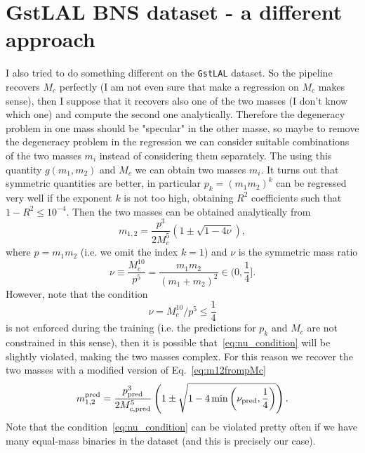 \documentclass[prd,aps,twocolumn,a4paper,showkeys,nofootinbib]{revtex4-1}
\begin{document}
\section{GstLAL BNS dataset - a different approach}
\label{sec:GstLAL2}
I also tried to do something different on the \texttt{GstLAL} dataset. 
So the pipeline recovers $M_c$ perfectly (I am not even sure that make a regression on $M_c$
makes sense), then I suppose that it recovers also one of the two masses 
(I don't know which one) and compute the second one analytically. Therefore the degeneracy problem
in one mass should be "specular" in the other masse, so maybe to remove the degeneracy problem
in the regression we can consider suitable combinations of the two masses $m_i$ instead of 
considering them separately. The using this quantity $g(m_1,m_2)$ and $M_c$ we can obtain 
two masses $m_i$. It turns out that symmetric quantities are better, in particular 
$p_k= (m_1 m_2)^k$ can be regressed very well if the exponent $k$ is not too high, 
obtaining $R^2$ coefficients such that $1-R^2 \leq 10^{-4}$. Then the two masses can be
obtained analytically from
\begin{equation}
\label{eq:m12frompMc}
m_{1,2} = \frac{p^3}{2 M_c^5}\left( 1 \pm \sqrt{1-4\nu} \right),
\end{equation}
where $p=m_1 m_2$ (i.e. we omit the index $k=1$) and $\nu$ is the symmetric mass ratio
\begin{equation}
\nu \equiv \frac{M_c^{10}}{p^5} = \frac{m_1 m_2}{(m_1+m_2)^2}\in (0, \frac{1}{4}].
\end{equation}
However, note that the condition
\begin{equation}
\label{eq:nu_condition}
\nu=M_c^{10}/p^5\leq \frac{1}{4}
\end{equation} 
is not enforced during the training (i.e. the predictions for 
$p_k$ and $M_c$ are not constrained in this sense), 
then it is possible that~\eqref{eq:nu_condition} will be slightly violated, making
the two masses complex. For this reason we recover the two masses with a modified version
of Eq.~\eqref{eq:m12frompMc}
\begin{equation}
\label{eq:m12frompMc_mod}
m_{1,2}^{\rm pred} = \frac{p_{\rm pred}^3}{2 M_{c, \rm pred}^5}\left( 1 \pm \sqrt{1-4 \min\left(\nu_{\rm pred}, \frac{1}{4}\right)} \right).
\end{equation}
Note that the condition~\eqref{eq:nu_condition} can be violated pretty often 
if we have many equal-mass binaries in the dataset (and this is precisely our case).
\end{document}
